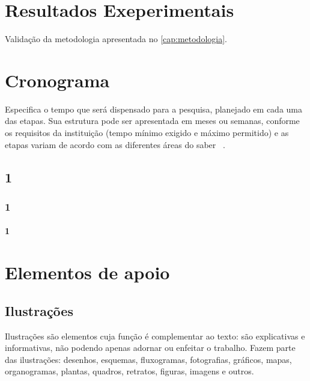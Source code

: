 \documentclass[12pt,oneside,a4paper,chapter=TITLE,section=TITLE,sumario
=tradicional]{abntex2}
\begin{document}
\chapter{Resultados Exeperimentais}
\label{cap:resultados}

Validação da metodologia apresentada no \autoref{cap:metodologia}.

\chapter{Cronograma}
\label{cap:cronograma}

Especifica o tempo que será dispensado para a pesquisa, planejado em cada uma 
das etapas. Sua estrutura pode ser apresentada em meses ou semanas, conforme os 
requisitos da instituição (tempo mínimo exigido e máximo permitido) e as etapas 
variam de acordo com as diferentes áreas do
saber~\cite{deitel2005java,deitel2006java} .

\section{1}
\subsection{1}
\subsubsection{1}


\chapter{Elementos de apoio}
\label{cap:apoio}

\section{Ilustrações}
\label{cap:ilustracoes}

Ilustrações são elementos cuja função é complementar ao texto: são explicativas 
e informativas, não podendo apenas adornar ou enfeitar o trabalho. Fazem parte 
das ilustrações: desenhos, esquemas, fluxogramas, fotografias, gráficos, mapas, 
organogramas, plantas, quadros, retratos, figuras, imagens e outros.
\end{document}
